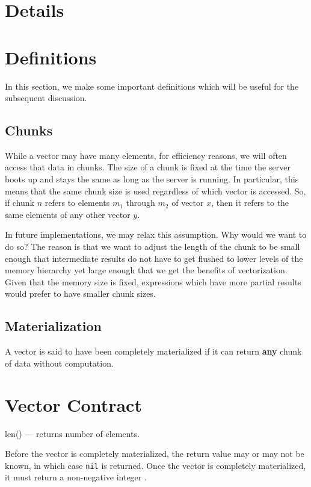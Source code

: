 \section{Details}


\section{Definitions}
In this section, we make some important definitions which will be useful for the
subsequent discussion. 

\subsection{Chunks}
While a vector may have many elements, for efficiency reasons, we will
often access that data in chunks. The size of a chunk is fixed at the
time the server boots up and stays the same as long as the server is
running. In particular, this means that the same chunk size is used
regardless of which vector is accessed. So, if chunk \(n\) refers to
elements \(m_1\) through \( m_2\) of vector \(x\), then it refers to
the same elements of any other vector \(y\).

In future implementations, we may relax this assumption. Why would we
want to do so? The reason is that we want to adjust the length of the
chunk to be small enough that intermediate results do not have to get
flushed to lower levels of the memory hierarchy yet large enough that
we get the benefits of vectorization.  Given that the memory size is
fixed, expressions which have more partial results would prefer to
have smaller chunk sizes.

\subsection{Materialization}
A vector is said to have been completely materialized if it can return {\bf any}
chunk of data without computation.


\section{Vector Contract}
\label{vector_contract}

\be
\item len() --- returns number of elements. 

Before the vector is completely materialized, the return value may or may not be
known, in which case {\tt nil} is returned.
Once the vector is completely materialized, it must return a non-negative
integer .

